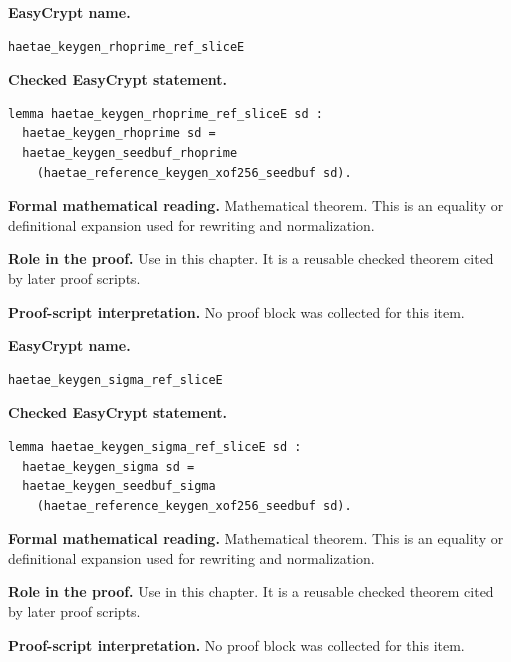 \begin{formaltheorem}
\noindent\textbf{EasyCrypt name.}
\begin{lstlisting}[language=EasyCrypt,basicstyle=\ttfamily\scriptsize]
haetae_keygen_rhoprime_ref_sliceE
\end{lstlisting}
\noindent\textbf{Checked EasyCrypt statement.}
\begin{lstlisting}[language=EasyCrypt,basicstyle=\ttfamily\scriptsize]
lemma haetae_keygen_rhoprime_ref_sliceE sd :
  haetae_keygen_rhoprime sd =
  haetae_keygen_seedbuf_rhoprime
    (haetae_reference_keygen_xof256_seedbuf sd).
\end{lstlisting}
\noindent\textbf{Formal mathematical reading.}
Mathematical theorem. This is an equality or definitional expansion used for rewriting and normalization.

\noindent\textbf{Role in the proof.}
Use in this chapter. It is a reusable checked theorem cited by later proof scripts.

\noindent\textbf{Proof-script interpretation.}
No proof block was collected for this item.

\end{formaltheorem}

\begin{formaltheorem}
\noindent\textbf{EasyCrypt name.}
\begin{lstlisting}[language=EasyCrypt,basicstyle=\ttfamily\scriptsize]
haetae_keygen_sigma_ref_sliceE
\end{lstlisting}
\noindent\textbf{Checked EasyCrypt statement.}
\begin{lstlisting}[language=EasyCrypt,basicstyle=\ttfamily\scriptsize]
lemma haetae_keygen_sigma_ref_sliceE sd :
  haetae_keygen_sigma sd =
  haetae_keygen_seedbuf_sigma
    (haetae_reference_keygen_xof256_seedbuf sd).
\end{lstlisting}
\noindent\textbf{Formal mathematical reading.}
Mathematical theorem. This is an equality or definitional expansion used for rewriting and normalization.

\noindent\textbf{Role in the proof.}
Use in this chapter. It is a reusable checked theorem cited by later proof scripts.

\noindent\textbf{Proof-script interpretation.}
No proof block was collected for this item.

\end{formaltheorem}


